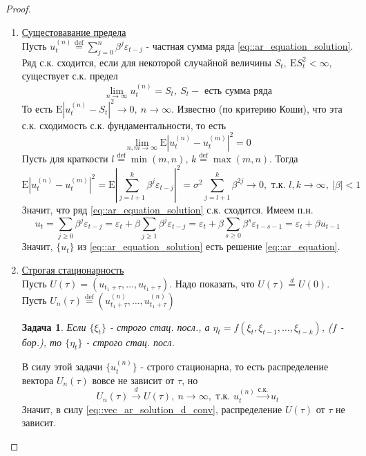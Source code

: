 \documentclass[12pt]{article}
\newtheorem*{task}{Задача}
\newcommand*{\defeq}{\stackrel{\text{def}}{=}}
\def\eps{ \varepsilon }
\def\E{ \mathrm{E} }
\begin{document}
\begin{proof}
    \begin{enumerate}
        \item \underline{Сущестовавание предела} \\
        Пусть $u_t^{(n)}\defeq\sum_{j=0}^n\beta^j\eps_{t-j}$ - частная сумма ряда \eqref{eq::ar_equation_solution}.
        Ряд с.к. сходится, если для некоторой случайной величины $S_t,\ \E S_t^2<\infty$, существует
        с.к. предел
        \[\lim_{n\rightarrow\infty}u_t^{(n)}=S_t,\ S_t-\text{ есть сумма ряда}\] 
        То есть $\E\left\lvert u_t^{(n)}-S_t\right\rvert ^2\rightarrow0,\ n\rightarrow\infty$. Известно (по критерию Коши),
        что эта с.к. сходимость с.к. фундаментальности, то есть 
        \[\lim_{n,m\rightarrow\infty}\E\left\lvert u_t^{(n)}-u_t^{(m)}\right\rvert ^2=0\]
        Пусть для краткости $l\defeq\min(m,n)$, $k\defeq\max(m,n)$. Тогда
        \[\E\left\lvert u_t^{(n)}-u_t^{(m)}\right\rvert ^2=\E\left\lvert \sum_{j=l+1}^k\beta^j\eps_{t-j}\right\rvert ^2=\sigma^2\sum_{j=l+1}^k\beta^{2j}\rightarrow0,\text{ т.к. }l,k\rightarrow\infty,\ |\beta|<1\]
        Значит, что ряд \eqref{eq::ar_equation_solution} с.к. сходится. Имеем п.н.
        \[u_t=\sum_{j\geq0}\beta^j\eps_{t-j}=\eps_t+\beta\sum_{j\geq1}\beta^j\eps_{t-j}=\eps_t+\beta\sum_{s\geq0}\beta^s\eps_{t-s-1}=\eps_t+\beta u_{t-1}\]
        Значит, $\{u_t\}$ из \eqref{eq::ar_equation_solution} есть решение \eqref{eq::ar_equation}.
        
        \item \underline{Строгая стационарность} \\
        Пусть $U(\tau)=(u_{t_1+\tau},\ldots,u_{t_1+\tau})$. Надо показать, что $U(\tau)\overset{d}{=}U(0)$. \\
        Пусть $U_n(\tau)\defeq(u^{(n)}_{t_1+\tau},\ldots,u^{(n)}_{t_1+\tau})$
        \begin{task}
            Если $\{\xi_t\}$ - строго стац. посл., а $\eta_t=f(\xi_t,\xi_{t-1},\ldots,\xi_{t-k})$, ($f$ - бор.),
            то $\{\eta_t\}$ - строго стац. посл.
        \end{task}
        В силу этой задачи $\{u_t^{(n)}\}$ - строго стационарна, то есть распределение вектора $U_n(\tau)$
        вовсе не зависит от $\tau$, но
        \begin{equation}\label{eq::vec_ar_solution_d_conv}
            U_n(\tau)\xrightarrow{d}U(\tau),\ n\rightarrow\infty,\text{ т.к. } u_t^{(n)}\xrightarrow{\text{с.к.}}u_t
        \end{equation}
        Значит, в силу \eqref{eq::vec_ar_solution_d_conv}, распределение $U(\tau)$ от $\tau$ не зависит.
        

\end{enumerate}
\end{proof}
\end{document}

